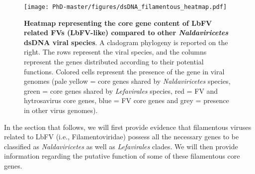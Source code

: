  \begin{figure}[!htpbt]
\texttt{[image: PhD-master/figures/dsDNA\_filamentous\_heatmap.pdf]}\centering
\caption[Paper2:\textit{Naldaviricetes} core genes heatmap]{\textbf{Heatmap representing the core gene content of LbFV related FVs (LbFV-like) compared to other \textit{Naldaviricetes} dsDNA viral species}. A cladogram phylogeny is reported on the right. The rows represent the viral species, and the columns represent the genes distributed according to their potential functions. Colored cells represent the presence of the gene in viral genomes (pale yellow = core genes shared by \textit{Naldaviricetes} species, green = core genes shared by \textit{Lefavirales} species, red = FV and hytrosavirus core genes, blue = FV core genes and grey = presence in other virus genomes).}
\label{figure:dsDNA_filamentous_heatmap}
\end{figure}

In the section that follows, we will first provide evidence that filamentous viruses related to LbFV (i.e., Filamentoviridae) possess all the necessary genes to be classified as \textit{Naldaviricetes} as well as \textit{Lefavirales} clades. We will then provide information regarding the putative function of some of these filamentous core genes. 

